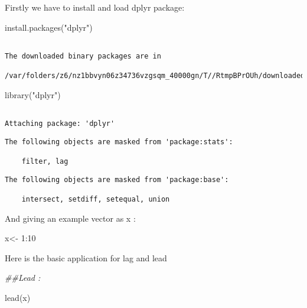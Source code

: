 \documentclass[
  letterpaper,
  DIV=11,
  numbers=noendperiod]{scrreprt}
\newenvironment{Shaded}{\begin{snugshade}}{\end{snugshade}}
\newcommand{\DecValTok}[1]{\textcolor[rgb]{0.68,0.00,0.00}{#1}}
\newcommand{\DocumentationTok}[1]{\textcolor[rgb]{0.37,0.37,0.37}{\textit{#1}}}
\newcommand{\FunctionTok}[1]{\textcolor[rgb]{0.28,0.35,0.67}{#1}}
\newcommand{\NormalTok}[1]{\textcolor[rgb]{0.00,0.23,0.31}{#1}}
\newcommand{\OtherTok}[1]{\textcolor[rgb]{0.00,0.23,0.31}{#1}}
\newcommand{\SpecialCharTok}[1]{\textcolor[rgb]{0.37,0.37,0.37}{#1}}
\newcommand{\StringTok}[1]{\textcolor[rgb]{0.13,0.47,0.30}{#1}}
\begin{document}
Firstly we have to install and load dplyr package:

\begin{Shaded}
\begin{Highlighting}[]
\FunctionTok{install.packages}\NormalTok{(}\StringTok{"dplyr"}\NormalTok{)       }
\end{Highlighting}
\end{Shaded}

\begin{verbatim}

The downloaded binary packages are in
    /var/folders/z6/nz1bbvyn06z34736vzgsqm_40000gn/T//RtmpBPrOUh/downloaded_packages
\end{verbatim}

\begin{Shaded}
\begin{Highlighting}[]
\FunctionTok{library}\NormalTok{(}\StringTok{"dplyr"}\NormalTok{)     }
\end{Highlighting}
\end{Shaded}

\begin{verbatim}

Attaching package: 'dplyr'
\end{verbatim}

\begin{verbatim}
The following objects are masked from 'package:stats':

    filter, lag
\end{verbatim}

\begin{verbatim}
The following objects are masked from 'package:base':

    intersect, setdiff, setequal, union
\end{verbatim}

And giving an example vector as x :

\begin{Shaded}
\begin{Highlighting}[]
\NormalTok{x}\OtherTok{\textless{}{-}} \DecValTok{1}\SpecialCharTok{:}\DecValTok{10}
\end{Highlighting}
\end{Shaded}

Here is the basic application for lag and lead

\begin{Shaded}
\begin{Highlighting}[]
\DocumentationTok{\#\#Lead :}

\FunctionTok{lead}\NormalTok{(x)}
\end{Highlighting}
\end{Shaded}
\end{document}
